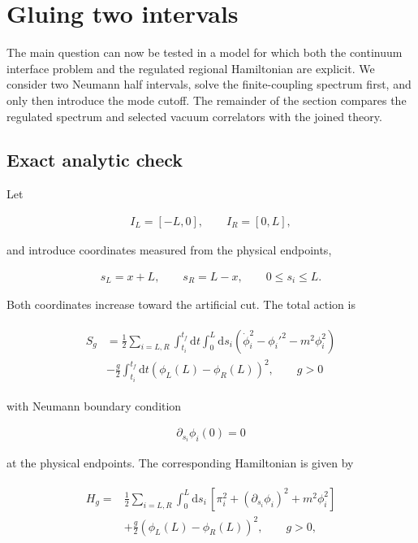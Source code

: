 \section{Gluing two intervals}\label{sec:two-intervals}

The main question can now be tested in a model for which both the continuum interface problem and the regulated regional Hamiltonian are explicit. We consider two Neumann half intervals, solve the finite-coupling spectrum first, and only then introduce the mode cutoff. The remainder of the section compares the regulated spectrum and selected vacuum correlators with the joined theory.

\subsection{Exact analytic check}\label{subsec:interval-analytic}

Let

\begin{align}
I_L=[-L,0],
\qquad
I_R=[0,L],
\end{align}

and introduce coordinates measured from the physical endpoints,

\begin{align}
s_L=x+L,
\qquad
s_R=L-x,
\qquad
0\leq s_i\leq L.
\end{align}

Both coordinates increase toward the artificial cut. The total action is

\begin{align}
\begin{aligned}
S_g & = \frac{1}{2}\sum_{i=L,R}\int_{t_i}^{t_f}\mathrm{d}t\int_0^L\mathrm{d}s_{i}\left(\dot{\phi}_{i}^2-\phi_{i}'^{2}-m^2\phi_i^2\right) \\
    & -\frac{g}{2}\int_{t_i}^{t_f}\mathrm{d}t \left(\phi_{L}(L)-\phi_{R}(L)\right)^2, \qquad g>0
\end{aligned}
\end{align}

with Neumann boundary condition

\begin{align}
\partial_{s_i}\phi_i(0)=0
\end{align}

at the physical endpoints. The corresponding Hamiltonian is given by

\begin{align}
\begin{aligned}
H_g={}&\frac12\sum_{i=L,R}\int_0^L\mathrm ds_i\,
\left[
\pi_i^2+(\partial_{s_i}\phi_i)^2+m^2\phi_i^2
\right]\\
&+\frac g2\left(\phi_L(L)-\phi_R(L)\right)^2,
\qquad g>0,
\end{aligned}
\end{align}

